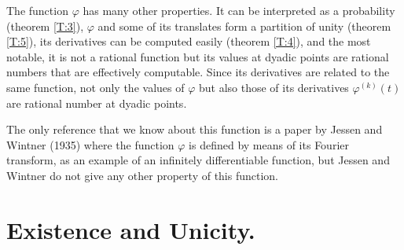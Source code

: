 \documentclass[10pt]{amsart}
\theoremstyle{definition}
\theoremstyle{remark}
\begin{document}
The function $\varphi$ has many other properties. It can be interpreted as 
a probability (theorem \ref{T:3}), $\varphi$ and some of its translates form a 
partition  of unity (theorem \ref{T:5}), its derivatives can be computed easily
(theorem \ref{T:4}), and the most notable, it is not a rational function but 
its values at dyadic points are rational numbers that are effectively computable.
Since its derivatives are related to the same function, not only the values 
of $\varphi$ but also those of its derivatives $\varphi^{(k)}(t)$ are rational number 
at dyadic points.

The only reference that we know about 
this function is a paper \cite{MR1501802} by Jessen and Wintner (1935) where
the function $\varphi$ is defined by means of its Fourier transform, as an 
example of an infinitely differentiable function, but Jessen and Wintner do 
not give any other property of this function.

\section{Existence and Unicity.}
\end{document}
